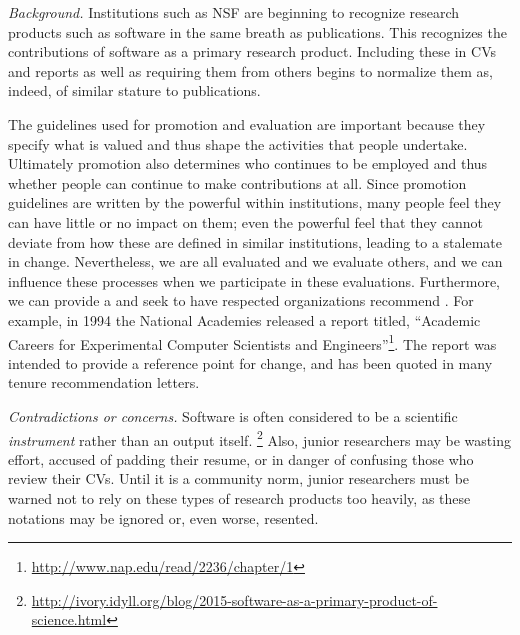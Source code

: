 \documentclass[a4paper,UKenglish]{dagman}
\begin{document}
\emph{Background.}
Institutions such as NSF are beginning to recognize research products such as software in the same breath as publications. This recognizes the contributions of software as a primary research product. Including these in CVs and reports as well as requiring them from others begins to normalize them as, indeed, of similar stature to publications. 

The guidelines used for promotion and evaluation are important because they specify what is valued and thus shape the activities that people undertake. Ultimately promotion also determines who continues to be employed and thus whether people can continue to make contributions at all. Since promotion guidelines are written by the powerful within institutions, many people feel they can have little or no impact on them; even the powerful feel that they cannot deviate from how these are defined in similar institutions, leading to a stalemate in change.
Nevertheless, we are all evaluated and we evaluate others, and we can influence these processes when we participate in these evaluations.
Furthermore, we can provide a   and seek to have respected organizations recommend . 
For example, in 1994 the National Academies released a report titled, ``Academic Careers for Experimental Computer Scientists and Engineers''\footnote{\url{http://www.nap.edu/read/2236/chapter/1}}. The report was intended to provide a reference point for change, and has been quoted in many tenure recommendation letters.


\emph{Contradictions or concerns.}
Software is often considered to be a scientific \emph{instrument} rather than an output itself.%
\footnote{\url{http://ivory.idyll.org/blog/2015-software-as-a-primary-product-of-science.html}}
Also, junior researchers may be wasting effort, accused of padding their resume, or in danger of confusing those who review their CVs. Until it is a community norm, junior researchers must be warned not to rely on these types of research products too heavily, as these notations may be ignored or, even worse, resented.
\end{document}
